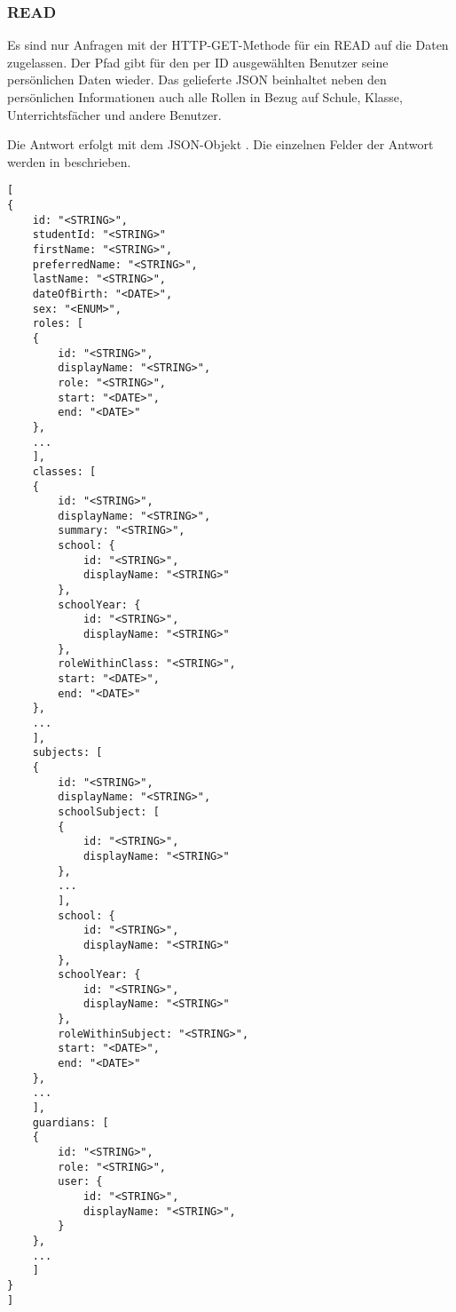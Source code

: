 \subsubsection{READ}
\label{sec:rest:api:users:id:read}
Es sind nur Anfragen mit der HTTP-GET-Methode für ein READ auf die Daten zugelassen.
Der Pfad gibt für den per ID ausgewählten Benutzer seine persönlichen Daten wieder. Das gelieferte JSON beinhaltet neben den persönlichen Informationen auch alle Rollen in Bezug auf Schule, Klasse, Unterrichtsfächer und andere Benutzer.

Die Antwort erfolgt mit dem JSON-Objekt . 
Die einzelnen Felder der Antwort werden in  beschrieben.

\begin{lstlisting}[caption={JSON-Antwort für einen GET-Aufruf des Pfads /api/users/\$id},label={lst:code:rest:api:users:id:read:ret},frame=tlrb]
[
{
	id: "<STRING>",
	studentId: "<STRING>"
 	firstName: "<STRING>",
 	preferredName: "<STRING>",
 	lastName: "<STRING>",
 	dateOfBirth: "<DATE>",
 	sex: "<ENUM>",
 	roles: [
 	{
 		id: "<STRING>",
 		displayName: "<STRING>",
 		role: "<STRING>",
 		start: "<DATE>",
 		end: "<DATE>"
 	},
 	...
 	],
 	classes: [
 	{
 		id: "<STRING>",
 		displayName: "<STRING>",
 		summary: "<STRING>",
 		school: {
 			id: "<STRING>",
 			displayName: "<STRING>"
 		},
 		schoolYear: {
 			id: "<STRING>",
 			displayName: "<STRING>"
 		},
 		roleWithinClass: "<STRING>",
 		start: "<DATE>",
 		end: "<DATE>"
 	},
 	...
	],
	subjects: [
	{
		id: "<STRING>",
		displayName: "<STRING>",
		schoolSubject: [
 		{
 			id: "<STRING>",
 			displayName: "<STRING>"
 		},
 		...
 		],
 		school: {
 			id: "<STRING>",
 			displayName: "<STRING>"
 		},
 		schoolYear: {
 			id: "<STRING>",
 			displayName: "<STRING>"
 		},
 		roleWithinSubject: "<STRING>",
 		start: "<DATE>",
 		end: "<DATE>" 		
	},
	...
	],
	guardians: [
	{
		id: "<STRING>",
		role: "<STRING>",
		user: {
			id: "<STRING>",
			displayName: "<STRING>",
		}
	},
	...
	]
}
]
\end{lstlisting}

